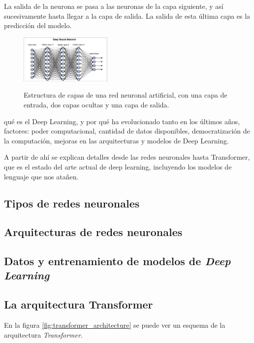 La salida de la neurona se pasa a las neuronas de la capa siguiente, y así sucesivamente hasta llegar a la capa de salida. La salida de esta última capa es la predicción del modelo. 

\begin{figure}[h]
    \caption[Estructura de capas de una red neuronal artificial]{Estructura de capas de una red neuronal artificial, con una capa de entrada, dos capas ocultas y una capa de salida.}
    \centering
    \includegraphics[width=0.4\textwidth]{./figuras/Deep_neural_network.png}
    \label{fig:deep_neural_network}
\end{figure}

qué es el Deep Learning, y por qué ha evolucionado tanto en los últimos años, factores: poder computacional, cantidad de datos disponibles, democratización de la computación, mejoras en las arquitecturas y modelos de Deep Learning.

A partir de ahí se explican detalles desde las redes neuronales hasta Transformer, que es el estado del arte actual de deep learning, incluyendo los modelos de lenguaje que nos atañen.


\subsection{Tipos de redes neuronales}
\subsection{Arquitecturas de redes neuronales}
\subsection{Datos y entrenamiento de modelos de \textit{Deep Learning}}

\subsection{La arquitectura Transformer}

En la figura \ref{fig:transformer_architecture} se puede ver un esquema de la arquitectura \textit{Transformer}.

